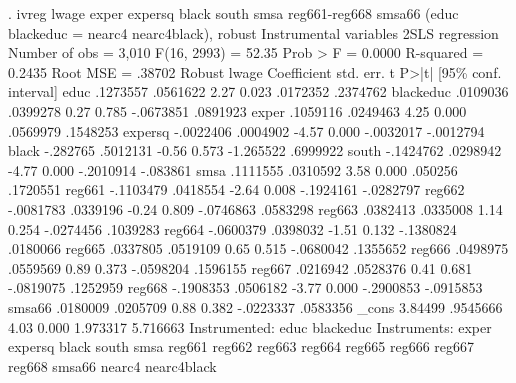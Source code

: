 . ivreg lwage exper expersq black south smsa reg661-reg668 smsa66 (educ blackeduc = nearc4 nearc4black), robust
{\smallskip}
Instrumental variables 2SLS regression          Number of obs     =      3,010
                                                F(16, 2993)       =      52.35
                                                Prob > F          =     0.0000
                                                R-squared         =     0.2435
                                                Root MSE          =     .38702
{\smallskip}
             {\VBAR}               Robust
       lwage {\VBAR} Coefficient  std. err.      t    P>|t|     [95\% conf. interval]
        educ {\VBAR}   .1273557   .0561622     2.27   0.023     .0172352    .2374762
   blackeduc {\VBAR}   .0109036   .0399278     0.27   0.785    -.0673851    .0891923
       exper {\VBAR}   .1059116   .0249463     4.25   0.000     .0569979    .1548253
     expersq {\VBAR}  -.0022406   .0004902    -4.57   0.000    -.0032017   -.0012794
       black {\VBAR}   -.282765   .5012131    -0.56   0.573    -1.265522    .6999922
       south {\VBAR}  -.1424762   .0298942    -4.77   0.000    -.2010914    -.083861
        smsa {\VBAR}   .1111555   .0310592     3.58   0.000      .050256    .1720551
      reg661 {\VBAR}  -.1103479   .0418554    -2.64   0.008    -.1924161   -.0282797
      reg662 {\VBAR}  -.0081783   .0339196    -0.24   0.809    -.0746863    .0583298
      reg663 {\VBAR}   .0382413   .0335008     1.14   0.254    -.0274456    .1039283
      reg664 {\VBAR}  -.0600379   .0398032    -1.51   0.132    -.1380824    .0180066
      reg665 {\VBAR}   .0337805   .0519109     0.65   0.515    -.0680042    .1355652
      reg666 {\VBAR}   .0498975   .0559569     0.89   0.373    -.0598204    .1596155
      reg667 {\VBAR}   .0216942   .0528376     0.41   0.681    -.0819075    .1252959
      reg668 {\VBAR}  -.1908353   .0506182    -3.77   0.000    -.2900853   -.0915853
      smsa66 {\VBAR}   .0180009   .0205709     0.88   0.382    -.0223337    .0583356
       _cons {\VBAR}    3.84499   .9545666     4.03   0.000     1.973317    5.716663
Instrumented: educ blackeduc
 Instruments: exper expersq black south smsa reg661 reg662 reg663 reg664
              reg665 reg666 reg667 reg668 smsa66 nearc4 nearc4black
{\smallskip}
